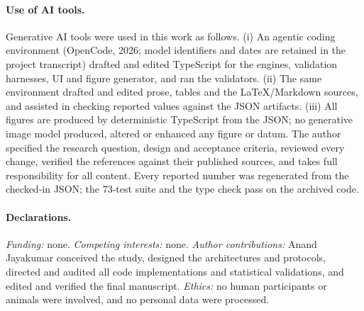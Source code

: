\documentclass[11pt,a4paper]{article}
\begin{document}
\paragraph{Use of AI tools.}
Generative AI tools were used in this work as follows. (i) An agentic coding environment (OpenCode, 2026; model identifiers and dates are retained in the project transcript) drafted and edited TypeScript for the engines, validation harnesses, UI and figure generator, and ran the validators. (ii) The same environment drafted and edited prose, tables and the \LaTeX/Markdown sources, and assisted in checking reported values against the JSON artifacts. (iii) All figures are produced by deterministic TypeScript from the JSON; no generative image model produced, altered or enhanced any figure or datum. The author specified the research question, design and acceptance criteria, reviewed every change, verified the references against their published sources, and takes full responsibility for all content. Every reported number was regenerated from the checked-in JSON; the 73-test suite and the type check pass on the archived code.

\paragraph{Declarations.}
\textit{Funding:} none. \textit{Competing interests:} none. \textit{Author contributions:} Anand Jayakumar conceived the study, designed the architectures and protocols, directed and audited all code implementations and statistical validations, and edited and verified the final manuscript. \textit{Ethics:} no human participants or animals were involved, and no personal data were processed.


\end{document}
